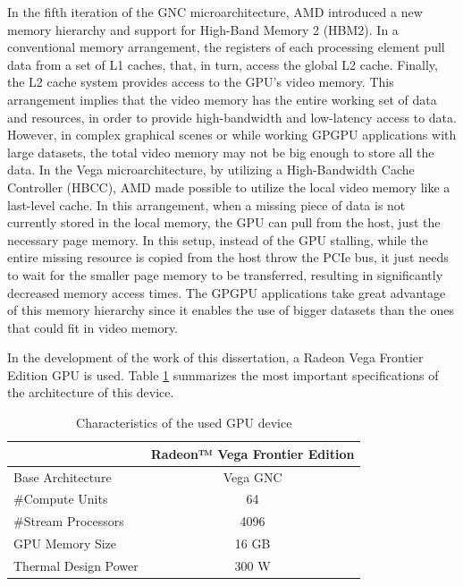 In the fifth iteration of the GNC microarchitecture, AMD introduced a new memory hierarchy and support for High-Band Memory 2 (HBM2). In a conventional memory arrangement, the registers of each processing element pull data from a set of L1 caches, that, in turn, access the global L2 cache. Finally, the L2 cache system provides access to the GPU's video memory. This arrangement implies that the video memory has the entire working set of data and resources, in order to provide high-bandwidth and low-latency access to data. However, in complex graphical scenes or while working GPGPU applications with large datasets, the total video memory may not be big enough to store all the data. In the Vega microarchitecture, by utilizing a  High-Bandwidth Cache Controller (HBCC), AMD made possible to utilize the local video memory like a last-level cache. In this arrangement, when a missing piece of data is not currently stored in the local memory, the GPU can pull from the host, just the necessary page memory. In this setup, instead of the GPU stalling, while the entire missing resource is copied from the host throw the PCIe bus, it just needs to wait for the smaller page memory to be transferred, resulting in significantly decreased memory access times. The GPGPU applications take great advantage of this memory hierarchy since it enables the use of bigger datasets than the ones that could fit in video memory.

In the development of the work of this dissertation, a Radeon Vega Frontier Edition GPU is used. Table \ref{tab:gpusepcs} summarizes the most important specifications of the architecture of this device.

\begin{table}[!htb]
    \renewcommand{\arraystretch}{1.2} %
    \centering
        \begin{tabular}{lc}
            \multicolumn{1}{c}{\textbf{}} & \multicolumn{1}{l}{\textbf{Radeon™ Vega Frontier Edition}} \\ \hline
            Base Architecture             & Vega GNC                                                   \\
            \#Compute Units               & 64                                                         \\
            \#Stream Processors           & 4096                                                       \\
            GPU Memory Size               & 16 GB                                                      \\
            Thermal Design Power          & 300 W                                                      \\ \hline
        \end{tabular}
    \caption{Characteristics of the used GPU device}
    \label{tab:gpusepcs}
\end{table}

